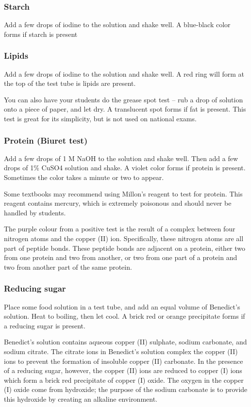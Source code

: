 \begin{itemize}
\subsubsection{Starch}
Add a few drops of iodine to the solution and shake well. A blue-black color forms if starch is present

\subsubsection{Lipids}
Add a few drops of iodine to the solution and shake well. A red ring will form at the top of the test tube is lipids are present.

You can also have your students do the grease spot test -- rub a drop of solution onto a piece of paper, and let dry. A translucent spot forms if fat is present. This test is great for its simplicity, but is not used on national exams.

\subsubsection{Protein (Biuret test)}
Add a few drops of 1 M NaOH to the solution and shake well. Then add a few drops of 1\% CuSO4 solution and shake. A violet color forms if protein is present. Sometimes the color takes a minute or two to appear. 

Some textbooks may recommend using Millon's reagent to test for protein. This reagent contains mercury, which is extremely poisonous and should never be handled by students.

The purple colour from a positive test is the result of a complex between four nitrogen atoms and the copper (II) ion. Specifically, these nitrogen atoms are all part of peptide bonds. These peptide bonds are adjacent on a protein, either two from one protein and two from another, or two from one part of a protein and two from another part of the same protein.

\subsubsection{Reducing sugar}
Place some food solution in a test tube, and add an equal volume of Benedict’s solution. Heat to boiling, then let cool. A brick red or orange precipitate forms if a reducing sugar is present.

Benedict's solution contains aqueous copper (II) sulphate, sodium carbonate, and sodium citrate. The citrate ions in Benedict's solution complex the copper (II) ions to prevent the formation of insoluble copper (II) carbonate. In the presence of a reducing sugar, however, the copper (II) ions are reduced to copper (I) ions which form a brick red precipitate of copper (I) oxide. The oxygen in the copper (I) oxide come from hydroxide; the purpose of the sodium carbonate is to provide this hydroxide by creating an alkaline environment.


\end{itemize}
